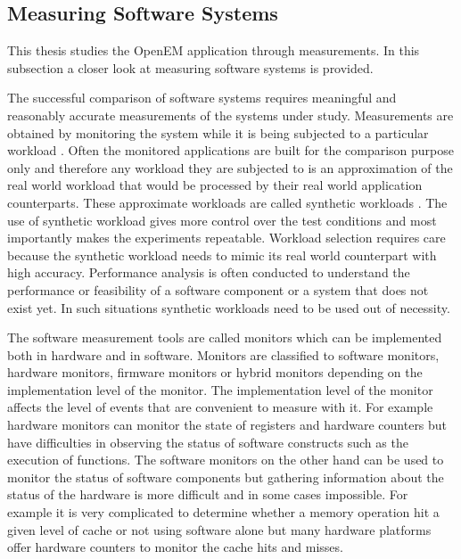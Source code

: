 \subsection{Measuring Software Systems}
\label{subsec:measure}
This thesis studies the OpenEM application through measurements. In this
subsection a closer look at measuring software systems is provided.

The successful comparison of software systems requires meaningful and reasonably
accurate measurements of the systems under study. Measurements are obtained by
monitoring the system while it is being subjected to a particular workload
\cite{jain1991art}. Often the monitored applications are built for the
comparison purpose only and therefore any workload they are subjected to is an
approximation of the real world workload that would be processed by their real
world application counterparts. These approximate workloads are called synthetic
workloads \cite{jain1991art}. The use of synthetic workload gives more control
over the test conditions and most importantly makes the experiments repeatable.
Workload selection requires care because the synthetic workload needs to mimic
its real world counterpart with high accuracy. Performance analysis is often
conducted to understand the performance or feasibility of a software component
or a system that does not exist yet. In such situations synthetic workloads need
to be used out of necessity. 

The software measurement tools are called monitors which can be implemented both
in hardware and in software. Monitors are classified to software monitors,
hardware monitors, firmware monitors or hybrid monitors depending on the
implementation level of the monitor. The implementation level of the monitor
affects the level of events that are convenient to measure with it. For example
hardware monitors can monitor the state of registers and hardware counters but
have difficulties in observing the status of software constructs such as the
execution of functions. The software monitors on the other hand can be used to
monitor the status of software components but gathering information about the
status of the hardware is more difficult and in some cases impossible.
\cite{jain1991art} For example it is very complicated to determine whether a
memory operation hit a given level of cache or not using software alone but many
hardware platforms offer hardware counters to monitor the cache hits and misses.


